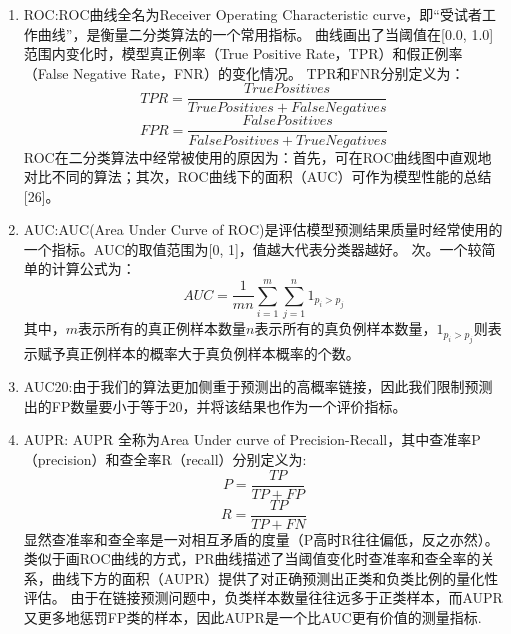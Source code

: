 \begin{enumerate}
    \item ROC:ROC曲线全名为Receiver Operating Characteristic curve，即“受试者工作曲线”，是衡量二分类算法的一个常用指标。
    曲线画出了当阈值在[0.0, 1.0]范围内变化时，模型真正例率（True Positive Rate，TPR）和假正例率（False Negative Rate，FNR）的变化情况。
    TPR和FNR分别定义为：
    \[ TPR = \frac{True Positives}{True Positives + False Negatives} \]
    \[ FPR = \frac{False Positives}{False Positives + True Negatives} \]
    ROC在二分类算法中经常被使用的原因为：首先，可在ROC曲线图中直观地对比不同的算法；其次，ROC曲线下的面积（AUC）可作为模型性能的总结[26]。
    \item AUC:AUC\cite{hanley1982meaning}(Area Under Curve of ROC)是评估模型预测结果质量时经常使用的一个指标。AUC的取值范围为[0, 1]，值越大代表分类器越好。
    次。一个较简单的计算公式为：
    \[AUC=\frac{1}{mn}\sum^m_{i=1}\sum^n_{j=1}1_{p_i>p_j}\]
    其中，$m$表示所有的真正例样本数量$n$表示所有的真负例样本数量，$1_{p_i>p_j}$则表示赋予真正例样本的概率大于真负例样本概率的个数。
    \item AUC20:由于我们的算法更加侧重于预测出的高概率链接，因此我们限制预测出的FP数量要小于等于20，并将该结果也作为一个评价指标。
    \item AUPR: AUPR\cite{davis2006relationship} 全称为Area Under curve of Precision-Recall，其中查准率P（precision）和查全率R（recall）分别定义为:
    \[P=\frac{TP}{TP+FP}\] \[R=\frac{TP}{TP+FN}\]
    显然查准率和查全率是一对相互矛盾的度量（P高时R往往偏低，反之亦然）。
    类似于画ROC曲线的方式，PR曲线描述了当阈值变化时查准率和查全率的关系，曲线下方的面积（AUPR）提供了对正确预测出正类和负类比例的量化性评估\cite{van2011gaussian}。
    由于在链接预测问题中，负类样本数量往往远多于正类样本，而AUPR又更多地惩罚FP类的样本，因此AUPR是一个比AUC更有价值的测量指标\cite{van2011gaussian}.
\end{enumerate}


